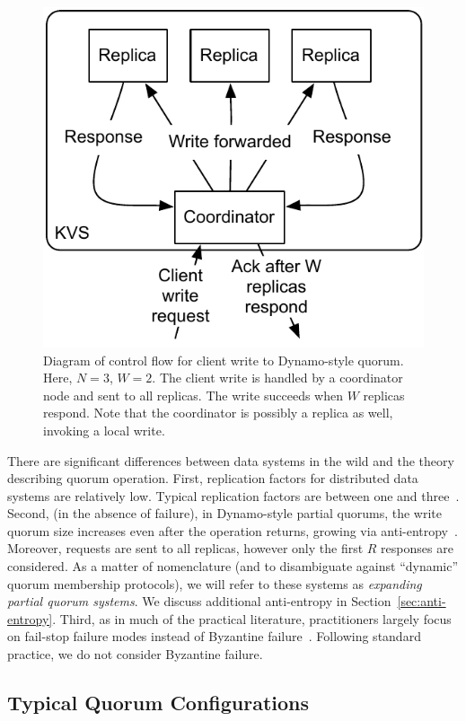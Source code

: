 \documentclass{vldb}
\newcommand{\subsectionskip}{-0em}
\begin{document}
\begin{figure}
\centering
\includegraphics[width=.7\columnwidth]{figs/dynamo-quorum.pdf}
\vspace{-8pt}
\caption{Diagram of control flow for client write to Dynamo-style
  quorum.  Here, $N=3$, $W=2$. The client write is handled by a
  coordinator node and sent to all replicas. The write succeeds when
  $W$ replicas respond.  Note that the coordinator is possibly a
  replica as well, invoking a local write.}
\vspace{-12pt}
\label{fig:dynamo-quorum}
\end{figure}

There are significant differences between data systems in the wild and
the theory describing quorum operation.  First, replication factors
for distributed data systems are relatively low.  Typical replication
factors are between one and three~\cite{cassandradefault, feinbergpc,
  codapc}.  Second, (in the absence of failure), in Dynamo-style
partial quorums, the write quorum size increases even after the
operation returns, growing via anti-entropy~\cite{antientropy}.
Moreover, requests are sent to all replicas, however only the first
$R$ responses are considered.  As a matter of nomenclature (and to
disambiguate against ``dynamic'' quorum membership protocols), we will
refer to these systems as \textit{expanding partial quorum
  systems}. We discuss additional anti-entropy in
Section~\ref{sec:anti-entropy}. Third, as in much of the practical
literature, practitioners largely focus on fail-stop failure modes
instead of Byzantine failure~\cite{birman-byzantine}.  Following
standard practice, we do not consider Byzantine failure.

\vspace{\subsectionskip}\subsection{Typical Quorum Configurations}
\end{document}
